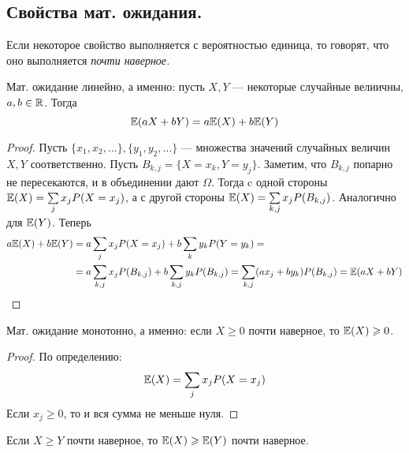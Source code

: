 \subsection{Свойства мат. ожидания.}
\begin{definition}
    Если некоторое свойство выполняется с вероятностью единица, то говорят, что оно выполняется \it{почти наверное}.
\end{definition}
\begin{proposal}
    Мат. ожидание линейно, а именно: пусть $X, Y$ --- некоторые случайные велиичны, $a, b \in \mathbb{R}$. Тогда
    \[
        \mathbb{E}(aX + bY) = a\mathbb{E}(X) + b\mathbb{E}(Y)
    \]
\end{proposal}
\begin{proof}
    Пусть $\{x_1, x_2, \ldots\}, \{y_1, y_2, \ldots\}$ --- множества значений случайных величин $X, Y$
    соответственно. Пусть $B_{k, j} = \{X = x_k, Y = y_j\}$. Заметим, что $B_{k, j}$ попарно не пересекаются,
    и в объединении дают $\Omega$. Тогда c одной стороны $\mathbb{E}(X) = \sum\limits_{j} x_j P(X = x_j)$, а
    с другой стороны $\mathbb{E}(X) = \sum\limits_{k, j} x_j P(B_{k, j})$. Аналогично для $\mathbb{E}(Y)$. Теперь
    \begin{align*}
        a\mathbb{E}(X) + b\mathbb{E}(Y) &= a\sum\limits_{j} x_j P(X = x_j) + b\sum\limits_{k} y_k P(Y = y_k) =\\
        &=a\sum\limits_{k, j} x_j P(B_{k, j}) + b\sum\limits_{k, j} y_k P(B_{k, j}) =
        \sum\limits_{k, j} (ax_j + by_k) P(B_{k, j}) = \mathbb{E}(aX + bY)
    \end{align*}
\end{proof}
\begin{comment}
    Последнее равенство справедливо по \hyperref[lemma_2.1]{лемме}: т.к. с одной стороны
    случайная величина $aX + bY$ принимает какие-то свои значения
    $\xi_i$ на множествах $\{aX + bY = \xi_i\}$, а сдругой стороны она принимает значения
    $y_k = ax_j + by_k$ на множествах $B_k = B_{k, j}$.
\end{comment}
\begin{proposal}
    Мат. ожидание монотонно, а именно: если $X \geq 0$ почти наверное, то $\mathbb{E}(X) \geqslant 0$.
\end{proposal}
\begin{proof}
    По определению:
    \[
        \mathbb{E}(X) = \sum\limits_{j} x_j P(X = x_j)
    \]
    Если $x_j \geq 0$, то и вся сумма не меньше нуля.
\end{proof}
\begin{corollary}
    Если $X \geq Y$ почти наверное, то $\mathbb{E}(X) \geqslant \mathbb{E}(Y)$ почти наверное.
\end{corollary}
